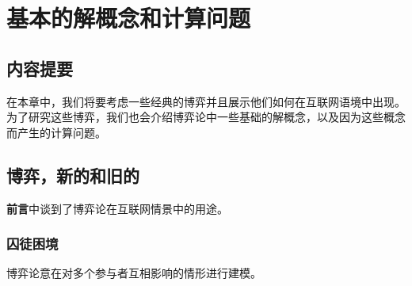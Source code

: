 \chapter{\textbf{基本的解概念和计算问题}}
\label{basic_concepts}

\section*{内容提要} 在本章中，我们将要考虑一些经典的博弈并且展示他们如何在互联网语境中出现。为了研究这些博弈，我们也会介绍博弈论中一些基础的解概念，以及因为这些概念而产生的计算问题。
\section{博弈，新的和旧的} \textbf{前言}中谈到了博弈论在互联网情景中的用途。
\newpage
\subsection{囚徒困境} 博弈论意在对多个参与者互相影响的情形进行建模。
\newpage